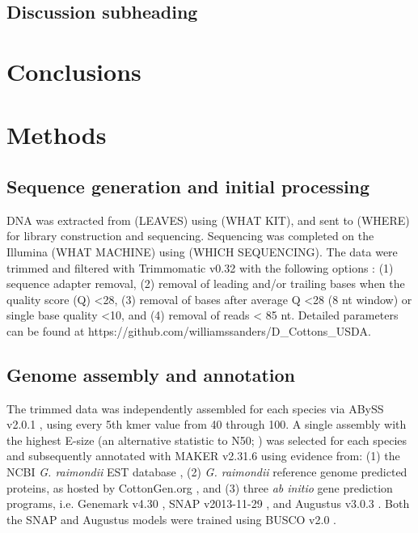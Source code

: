 \documentclass{bmcart}
\newcommand{\note}[2][]{\added[id=#1,remark={#2}]{}}
\begin{document}
\subsection*{Discussion subheading}

\section*{Conclusions}

\section*{Methods}
\subsection*{Sequence generation and initial processing}
DNA was extracted from (LEAVES) using (WHAT KIT), and sent to (WHERE) for library construction and sequencing.  Sequencing was completed on the Illumina (WHAT MACHINE) using (WHICH SEQUENCING). The data were trimmed and filtered with Trimmomatic v0.32 \note[Corrinne]{citation} with the following options : (1) sequence adapter removal, (2) removal of leading and/or trailing bases when the quality score (Q) <28, (3) removal of bases after average Q <28 (8 nt window) or single base quality <10, and (4) removal of reads < 85 nt. Detailed parameters can be found at https://github.com/williamssanders/D\_Cottons\_USDA. \note[Corrinne]{Let's port this repo to a lab site after and give the new url}

\subsection*{Genome assembly and annotation}
The trimmed data was independently assembled for each species via ABySS v2.0.1 \note[Corrinne]{citation}, using every 5th kmer value from 40 through 100. A single assembly with the highest E-size  (an alternative statistic to N50; \note[Corrinne]{citation Salzberg 2011}) was selected for each species and subsequently annotated with MAKER v2.31.6 \note[Corrinne]{citation} using evidence from: (1) the NCBI \textit{G. raimondii} EST database \note[Corrinne]{citation}, (2) \textit{G. raimondii} reference genome predicted proteins, as hosted by CottonGen.org \note[Corrinne]{citation}, and (3) three \textit{ab initio} gene prediction programs, i.e. Genemark v4.30 \note[Corrinne]{citation}, SNAP v2013-11-29 \note[Corrinne]{citation}, and Augustus v3.0.3 \note[Corrinne]{citation}. Both the SNAP and Augustus models were trained using BUSCO v2.0 \note[Corrinne]{citation}.    
\end{document}
